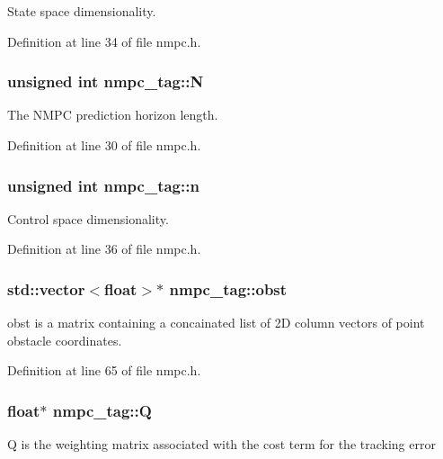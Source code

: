 State space dimensionality. 



Definition at line 34 of file nmpc.\-h.

\hypertarget{structnmpc__tag_ab0e6fcef53bf96255ed8250d7b92ad33}{
\subsubsection[{N}]{\setlength{\rightskip}{0pt plus 5cm}unsigned int nmpc\-\_\-tag\-::\-N}}\label{structnmpc__tag_ab0e6fcef53bf96255ed8250d7b92ad33}


The N\-M\-P\-C prediction horizon length. 



Definition at line 30 of file nmpc.\-h.

\hypertarget{structnmpc__tag_a8d8c004fbbaba22a78a44e9b712054c4}{
\subsubsection[{n}]{\setlength{\rightskip}{0pt plus 5cm}unsigned int nmpc\-\_\-tag\-::n}}\label{structnmpc__tag_a8d8c004fbbaba22a78a44e9b712054c4}


Control space dimensionality. 



Definition at line 36 of file nmpc.\-h.

\hypertarget{structnmpc__tag_a6289f56c8d80a427a8afe333fb4db027}{
\subsubsection[{obst}]{\setlength{\rightskip}{0pt plus 5cm}std\-::vector$<$float$>$$\ast$ nmpc\-\_\-tag\-::obst}}\label{structnmpc__tag_a6289f56c8d80a427a8afe333fb4db027}
obst is a matrix containing a concainated list of 2\-D column vectors of point obstacle coordinates. 

Definition at line 65 of file nmpc.\-h.

\hypertarget{structnmpc__tag_a17b9178baecdfa5d433aaa6b148753cf}{
\subsubsection[{Q}]{\setlength{\rightskip}{0pt plus 5cm}float$\ast$ nmpc\-\_\-tag\-::\-Q}}\label{structnmpc__tag_a17b9178baecdfa5d433aaa6b148753cf}
Q is the weighting matrix associated with the cost term for the tracking error 

